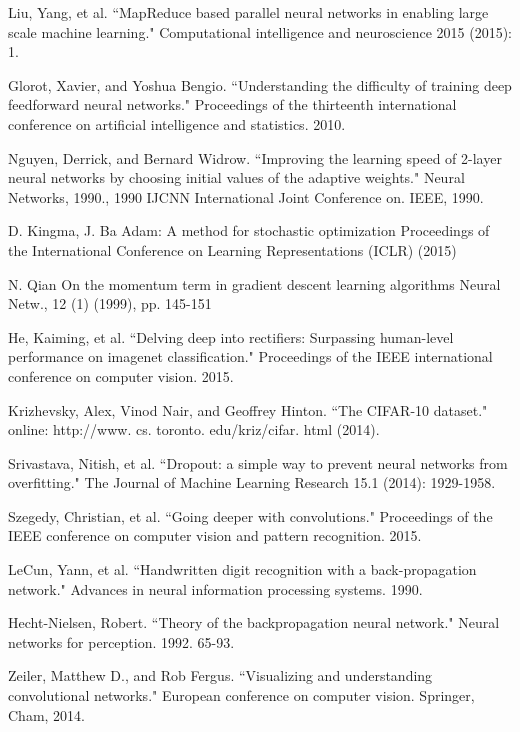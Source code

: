 \documentclass[12pt]{report}
\begin{document}
\begin{thebibliography}{}
Liu, Yang, et al. ``MapReduce based parallel neural networks in enabling large scale machine learning." Computational intelligence and neuroscience 2015 (2015): 1.


Glorot, Xavier, and Yoshua Bengio. ``Understanding the difficulty of training deep feedforward neural networks." Proceedings of the thirteenth international conference on artificial intelligence and statistics. 2010.


Nguyen, Derrick, and Bernard Widrow. ``Improving the learning speed of 2-layer neural networks by choosing initial values of the adaptive weights." Neural Networks, 1990., 1990 IJCNN International Joint Conference on. IEEE, 1990.

D. Kingma, J. Ba
Adam: A method for stochastic optimization
Proceedings of the International Conference on Learning Representations (ICLR) (2015)

N. Qian
On the momentum term in gradient descent learning algorithms
Neural Netw., 12 (1) (1999), pp. 145-151

He, Kaiming, et al. ``Delving deep into rectifiers: Surpassing human-level performance on imagenet classification." Proceedings of the IEEE international conference on computer vision. 2015.

Krizhevsky, Alex, Vinod Nair, and Geoffrey Hinton. ``The CIFAR-10 dataset." online: http://www. cs. toronto. edu/kriz/cifar. html (2014).


Srivastava, Nitish, et al. ``Dropout: a simple way to prevent neural networks from overfitting." The Journal of Machine Learning Research 15.1 (2014): 1929-1958.

Szegedy, Christian, et al. ``Going deeper with convolutions." Proceedings of the IEEE conference on computer vision and pattern recognition. 2015.

LeCun, Yann, et al. ``Handwritten digit recognition with a back-propagation network." Advances in neural information processing systems. 1990.


Hecht-Nielsen, Robert. ``Theory of the backpropagation neural network." Neural networks for perception. 1992. 65-93.

Zeiler, Matthew D., and Rob Fergus. ``Visualizing and understanding convolutional networks." European conference on computer vision. Springer, Cham, 2014.



\end{thebibliography}
\end{document}
